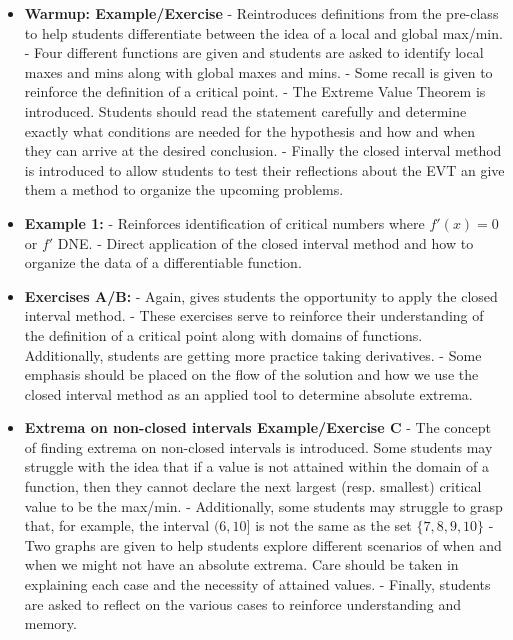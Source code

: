 \documentclass[10pt]{article}
\begin{document}
{\begin{itemize}
\item {\bf Warmup: Example/Exercise}  
    - Reintroduces definitions from the pre-class to help students differentiate between the idea of a local and global max/min.  
    - Four different functions are given and students are asked to identify local maxes and mins along with global maxes and mins.
    - Some recall is given to reinforce the definition of a critical point.
    - The Extreme Value Theorem is introduced. Students should read the statement carefully and determine exactly what conditions are needed for the hypothesis and how and when they can arrive at the desired conclusion.
    - Finally the closed interval method is introduced to allow students to test their reflections about the EVT an give them a method to organize the upcoming problems.
    \item {\bf Example 1:}  
    - Reinforces identification of critical numbers where $f'(x)=0$ or $f'$ DNE.  
    - Direct application of the closed interval method and how to organize the data of a differentiable function.
    
    \item {\bf Exercises A/B:}  
    - Again, gives students the opportunity to apply the closed interval method. 
    - These exercises serve to reinforce their understanding of the definition of a critical point along with domains of functions. Additionally, students are getting more practice taking derivatives.
    - Some emphasis should be placed on the flow of the solution and how we use the closed interval method as an applied tool to determine absolute extrema.
    
    \item {\bf Extrema on non-closed intervals Example/Exercise C}  
    - The concept of finding extrema on non-closed intervals is introduced. Some students may struggle with the idea that if a value is not attained within the domain of a function, then they cannot declare the next largest (resp. smallest) critical value to be the max/min.
    - Additionally, some students may struggle to grasp that, for example, the interval $(6,10]$ is not the same as the set $\{7,8,9,10\}$
    - Two graphs are given to help students explore different scenarios of when and when we might not have an absolute extrema. Care should be taken in explaining each case and the necessity of attained values.
    - Finally, students are asked to reflect on the various cases to reinforce understanding and memory.
    

\end{itemize}}
\end{document}
